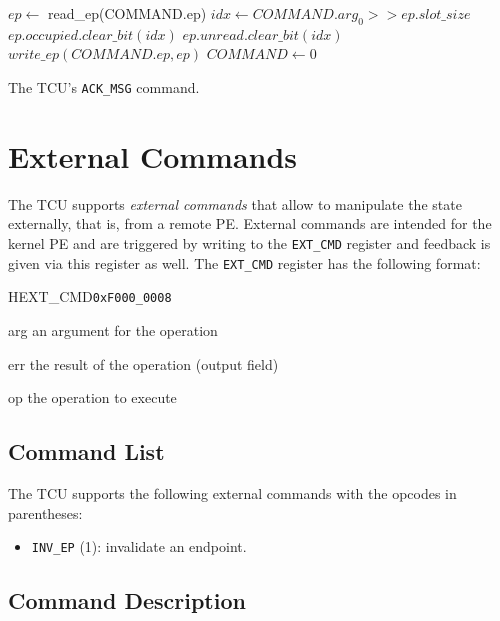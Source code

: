 \documentclass[a4paper,11pt]{article}
\begin{document}
\begin{algorithm}[H]
    $ep \gets$ read\_ep(COMMAND.ep)\;
    \BlankLine
    $idx \gets COMMAND.arg_0 >> ep.slot\_size$\;
    $ep.occupied.clear\_bit(idx)$\;
    $ep.unread.clear\_bit(idx)$\;
    $write\_ep(COMMAND.ep, ep)$\;
    \BlankLine
    \BlankLine
    $COMMAND \gets 0$\;
    \caption{The TCU's \texttt{ACK\_MSG} command.}
\end{algorithm}

\section{External Commands}

The TCU supports \emph{external commands} that allow to manipulate the state externally, that is,
from a remote PE. External commands are intended for the kernel PE and are triggered by writing to
the \texttt{EXT\_CMD} register and feedback is given via this register as well. The
\texttt{EXT\_CMD} register has the following format:

\begin{register}{H}{EXT\_CMD}{\texttt{0xF000\_0008}}
  \regnewline%
  \begin{regdesc}\begin{reglist}
    \item[arg] an argument for the operation
    \item[err] the result of the operation (output field)
    \item[op] the operation to execute
  \end{reglist}\end{regdesc}
\end{register}

\subsection{Command List}

The TCU supports the following external commands with the opcodes in parentheses:

\begin{itemize}
  \item \texttt{INV\_EP} (1): invalidate an endpoint.
\end{itemize}

\subsection{Command Description}
\end{document}
